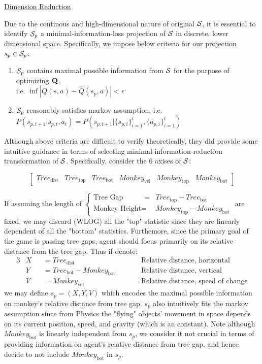 \documentclass[11pt]{article}
\theoremstyle{definition}
\begin{document}
\underline{Dimension Reduction}

Due to the continous and high-dimensional nature of original ${\cal S}$, it is essential to identify ${\cal S}_p$ a minimal-information-loss projection of ${\cal S}$ in discrete, lower dimensional space. Specifically, we impose below criteria for our projection $s_p \in {\cal S}_p$:
\begin{enumerate}
\item ${\cal S}_p$ contains maximal possible information from ${\cal S}$ for the purpose of optimizing ${\bf Q}$, \\ i.e. $\inf |Q(s, a) - \hat{Q}(s_p, a)| < \epsilon$
\item ${\cal S}_p$ reasonably satisfies markov assumption, i.e. $P(s_{p,t+1}|s_{p,t}, a_{t}) = P(s_{p, t+1}| \{s_{p, i}\}_{i=1}^t, \{a_{p, i}\}_{i=1}^t )$
\end{enumerate}

Although above criteria are difficult to verify theoretically, they did provide some intuitive guidance in terms of selecting minimal-information-reduction transformation of ${\cal S}$. Specifically, consider the 6 axises of ${\cal S}$:

$$\begin{bmatrix}
Tree_{\mbox{dist}} & Tree_{\mbox{top}} & Tree_{\mbox{bot}} &
Monkey_{\mbox{vel}} & Monkey_{\mbox{top}} & Monkey_{\mbox{bot}}
\end{bmatrix} $$

If assuming the length of 
$
\left\{\begin{matrix}
\mbox{Tree Gap} \quad\qquad = & Tree_{\mbox{top}} - Tree_{\mbox{bot}}
\\ 
\mbox{Monkey Height} = & Monkey_{\mbox{top}} - Monkey_{\mbox{bot}}
\end{matrix}\right.
$ are fixed, we may discard (WLOG) all the "top" statistic since they are linearly dependent of all the "bottom" statistics. Furthemore, since the primary goal of the game is passing tree gaps, agent should focus primarily on its relative distance from the tree gap. Thus if denote:
\begin{alignat*}{3}
&  X && = Tree_{\mbox{dist}}
\qquad &&
\mbox{Relative distance, horizontal}
\\
&  Y && = Tree_{\mbox{bot}} - Monkey_{\mbox{bot}}
\qquad &&
\mbox{Relative distance, vertical}
\\
& V && = Monkey_{\mbox{vel}}
\qquad &&
\mbox{Relative distance, speed of change}
\end{alignat*}
we may define $s_p = (X, Y, V)$ which encodes the maximal possible information on monkey's relative distance from tree gap. $s_p$ also intuitively fits the markov assumption since from Physics the "flying" objects' movement in space depends on its current position, speed, and gravity (which is an constant). Note although $Monkey_{\mbox{bot}}$ is linearly independent from $s_p$, we consider it not crucial in terms of providing information on agent's relative distance from tree gap, and hence decide to not include $Monkey_{\mbox{bot}}$ in $s_p$.\\
\end{document}
